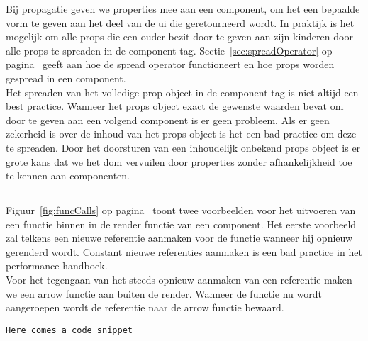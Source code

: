 Bij propagatie geven we properties mee aan een component, om het een bepaalde vorm te geven aan het deel van de \gls{ui} die geretourneerd wordt. In praktijk is het mogelijk om alle props die een ouder bezit door te geven aan zijn kinderen door alle props te spreaden in de component tag. Sectie~\ref{sec:spreadOperator} op pagina~\pageref{sec:spreadOperator} geeft aan hoe de spread operator functioneert en hoe props worden gespread in een component.\\
Het spreaden van het volledige prop object in de component tag is niet altijd een best practice. Wanneer het props object exact de gewenste waarden bevat om door te geven aan een volgend component is er geen probleem. Als er geen zekerheid is over de inhoud van het props object is het een bad practice om deze te spreaden. Door het doorsturen van een inhoudelijk onbekend props object is er grote kans dat we het \gls{dom} vervuilen door properties zonder afhankelijkheid toe te kennen aan componenten.

\subsection{}
\label{sec:functionCalls}

Figuur~\ref{fig:funcCalls} op pagina~\pageref{fig:funcCalls} toont twee voorbeelden voor het uitvoeren van een functie binnen in de render functie van een component. Het eerste voorbeeld zal telkens een nieuwe referentie aanmaken voor de functie wanneer hij opnieuw gerenderd wordt. Constant nieuwe referenties aanmaken is een bad practice in het performance handboek.\\
Voor het tegengaan van het steeds opnieuw aanmaken van een referentie maken we een arrow functie aan buiten de render. Wanneer de functie nu wordt aangeroepen wordt de referentie naar de arrow functie bewaard.

\newpage
\begin{lstlisting}[caption=Lazy loading met suspense, label={fig:funcCalls}]
    Here comes a code snippet
\end{lstlisting}